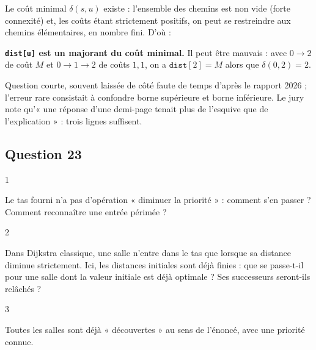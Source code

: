\documentclass[11pt,a4paper]{article}
\newcommand{\equationajustee}[1]{%
  \sbox{\boiteequation}{$\displaystyle #1$}%
  \ifdim\wd\boiteequation>\linewidth
    \[\resizebox{\linewidth}{!}{\usebox{\boiteequation}}\]%
  \else
    \[#1\]%
  \fi}
\begin{document}
Le coût minimal \(\delta(s,u)\) existe : l'ensemble des chemins est non vide (forte connexité) et, les coûts étant strictement positifs, on peut se restreindre aux chemins élémentaires, en nombre fini. D'où :

\equationajustee{\begin{aligned}
\delta(s,u) &= \min_{P : s \leadsto u} \mathrm{cout}(P) \\
&\le \mathrm{cout}(P_u) \\
&= \texttt{dist}[u].
\end{aligned}}

\textbf{\texttt{dist{[}u{]}} est un majorant du coût minimal.} Il peut être mauvais : avec \(0 \to 2\) de coût \(M\) et \(0 \to 1 \to 2\) de coûts \(1, 1\), on a \(\texttt{dist}[2] = M\) alors que \(\delta(0,2) = 2\).

\begin{jury}

Question courte, souvent laissée de côté faute de temps d'après le rapport 2026 ; l'erreur rare consistait à confondre borne supérieure et borne inférieure. Le jury note qu'« une réponse d'une demi-page tenait plus de l'esquive que de l'explication » : trois lignes suffisent.

\end{jury}

\hypertarget{question-23}{%
\subsection{Question 23}\label{question-23}}

\begin{indication}{1}

Le tas fourni n'a pas d'opération « diminuer la priorité » : comment s'en passer ? Comment reconnaître une entrée périmée ?

\end{indication}

\begin{indication}{2}

Dans Dijkstra classique, une salle n'entre dans le tas que lorsque sa distance diminue strictement. Ici, les distances initiales sont déjà finies : que se passe-t-il pour une salle dont la valeur initiale est déjà optimale ? Ses successeurs seront-ils relâchés ?

\end{indication}

\begin{indication}{3}

Toutes les salles sont déjà « découvertes » au sens de l'énoncé, avec une priorité connue.

\end{indication}
\end{document}
